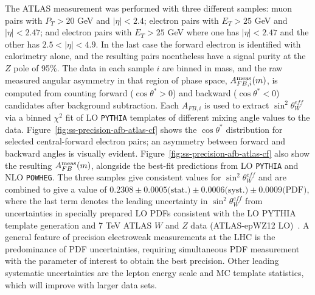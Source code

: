 The ATLAS measurement was performed with three different samples: muon
pairs with $P_T > 20$ GeV and $|\eta| < 2.4$; electron pairs with $E_T
> 25$ GeV and $|\eta| < 2.47$; and electron pairs with $E_T > 25$ GeV
where one has $|\eta| < 2.47$ and the other has $2.5 < |\eta| < 4.9$.
In the last case the forward electron is identified with calorimetry
alone, and the resulting pairs noentheless have a signal purity at the
$Z$ pole of 95\%.  The data in each sample $i$ are binned in mass, and
the raw measured angular asymmetry in that region of phase space,
$A^{\rm meas}_{FB, i}(m)$, is computed from counting forward
($\cos\theta^* > 0$) and backward ($\cos\theta^* < 0$) candidates
after background subtraction.  Each $A_{FB,i}$ is used to extract
$\sin^2\theta^{eff}_{W}$ via a binned $\chi^2$ fit of
LO \texttt{PYTHIA} templates of different mixing angle values to the
data.  Figure~\ref{fig:ss-precision-afb-atlas-cf} shows the
$\cos\theta^*$ distribution for selected central-forward electron
pairs; an asymmetry between forward and backward angles is visually
evident.  Figure~\ref{fig:ss-precision-afb-atlas-cf} also show the
resulting $A^{\rm meas}_{FB}(m)$, alongside the best-fit predictions
from LO \texttt{PYTHIA} and NLO \texttt{POWHEG}.  The three samples
give consistent values for $\sin^2\theta^{eff}_{W}$ and are combined
to give a value of $0.2308 \pm 0.0005\textrm{(stat.)} \pm
0.0006\textrm{(syst.)} \pm 0.0009\textrm{(PDF)}$, where the last term
denotes the leading uncertainty in $\sin^2\theta^{eff}_{W}$ from
uncertainties in specially prepared LO PDFs consistent with the LO
PYTHIA template generation and 7 TeV ATLAS $W$ and $Z$ data
(ATLAS-epWZ12 LO)~\cite{Aad:2011dm}.  A general feature of precision
electroweak measurements at the LHC is the predominance of PDF
uncertainties, requiring simultaneous PDF measurement with the
parameter of interest to obtain the best precision.  Other leading
systematic uncertainties are the lepton energy scale and MC template
statistics, which will improve with larger data sets.

